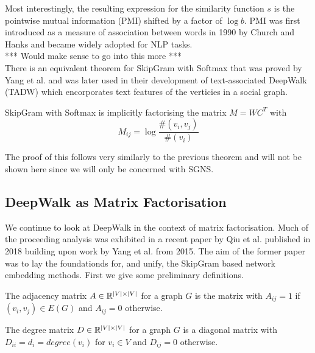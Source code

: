 \documentclass[a4paper]{article}
\begin{document}
Most interestingly, the resulting expression for the similarity function $s$ is
the pointwise mutual information (PMI) shifted by a factor of $\log b$. PMI was
first introduced as a measure of association between words in 1990 by Church and Hanks
\cite{church1990} and became widely adopted for NLP tasks.\\
*** Would make sense to go into this more ***\\
There is an equivalent theorem for SkipGram with Softmax that was proved by Yang
et al.\cite{yangalternative2015} and was later used in their development of
text-associated DeepWalk (TADW)\cite{yang2015} which encorporates text features
of the verticies in a social graph.

\begin{theorem}[Yang et al. (2015)]
  SkipGram with Softmax is implicitly factorising the matrix $M = WC^T$ with
  \[M_{ij} = \log{\frac{\#(v_i,v_j)}{\#(v_i)}}\]
\end{theorem}
The proof of this follows very similarly to the previous theorem and will not be
shown here since we will only be concerned with SGNS.

\subsection{DeepWalk as Matrix Factorisation}
We continue to look at DeepWalk in the context of matrix factorisation. Much of the proceeding analysis was exhibited in a recent paper by Qiu et
al.\cite{qiu2018} published in 2018 building upon work by Yang et al.\cite{yang2015}
from 2015. The aim of the former paper was to lay the foundationds for, and
unify, the SkipGram based network embedding methods. First we give some preliminary definitions.
\begin{definition}
  The adjacency matrix $A \in \R^{|V| \times |V|}$ for a graph $G$ is the matrix with $A_{ij} = 1$ if $(v_i, v_j) \in E(G)$ and $A_{ij} = 0$ otherwise.
\end{definition}

\begin{definition}
  The degree matrix $D \in \R^{|V| \times |V|}$ for a graph $G$ is a diagonal
  matrix with $D_{ii} = d_i = degree(v_i)$ for $v_i \in V$ and $D_{ij} = 0$ otherwise.
\end{definition}
\end{document}
